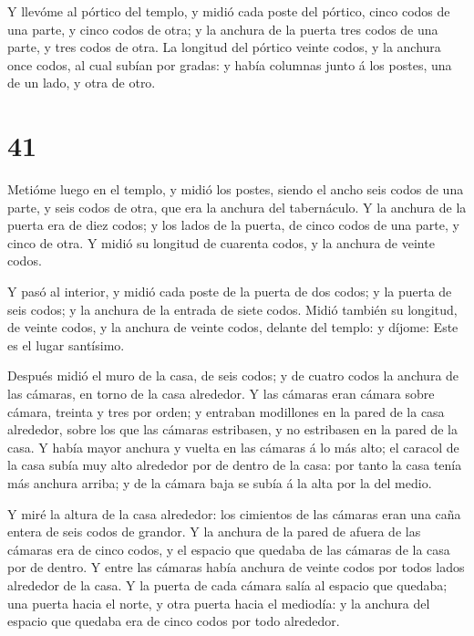  Y llevóme al pórtico del templo, y midió cada poste del
pórtico, cinco codos de una parte, y cinco codos de otra; y la anchura
de la puerta tres codos de una parte, y tres codos de otra.
 La longitud del pórtico veinte codos, y la anchura once
codos, al cual subían por gradas: y había columnas junto á los postes,
una de un lado, y otra de otro.

\hypertarget{section-40}{%
\section{41}\label{section-40}}

 Metióme luego en el templo, y midió los postes, siendo el
ancho seis codos de una parte, y seis codos de otra, que era la anchura
del tabernáculo.  Y la anchura de la puerta era de diez
codos; y los lados de la puerta, de cinco codos de una parte, y cinco de
otra. Y midió su longitud de cuarenta codos, y la anchura de veinte
codos.

 Y pasó al interior, y midió cada poste de la puerta de dos
codos; y la puerta de seis codos; y la anchura de la entrada de siete
codos.  Midió también su longitud, de veinte codos, y la
anchura de veinte codos, delante del templo: y díjome: Este es el lugar
santísimo.

 Después midió el muro de la casa, de seis codos; y de
cuatro codos la anchura de las cámaras, en torno de la casa alrededor.
 Y las cámaras eran cámara sobre cámara, treinta y tres por
orden; y entraban modillones en la pared de la casa alrededor, sobre los
que las cámaras estribasen, y no estribasen en la pared de la casa.
 Y había mayor anchura y vuelta en las cámaras á lo más
alto; el caracol de la casa subía muy alto alrededor por de dentro de la
casa: por tanto la casa tenía más anchura arriba; y de la cámara baja se
subía á la alta por la del medio.

 Y miré la altura de la casa alrededor: los cimientos de las
cámaras eran una caña entera de seis codos de grandor.  Y la
anchura de la pared de afuera de las cámaras era de cinco codos, y el
espacio que quedaba de las cámaras de la casa por de dentro.
 Y entre las cámaras había anchura de veinte codos por
todos lados alrededor de la casa.  Y la puerta de cada
cámara salía al espacio que quedaba; una puerta hacia el norte, y otra
puerta hacia el mediodía: y la anchura del espacio que quedaba era de
cinco codos por todo alrededor.

